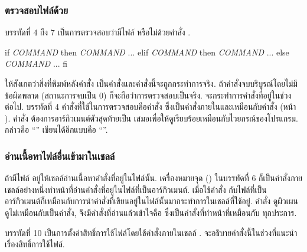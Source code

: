 \begin{thwbr}
\subsubsection{ตรวจสอบไฟล์ด้วย }
บรรทัดที่ 4 ถึง 7 เป็นการตรวจสอบว่ามีไฟล์  หรือไม่ด้วยคำสั่ง .
\begin{MyVerbatim}
if \textit{COMMAND}
then
    \textit{COMMAND}
    ...
elif \textit{COMMAND}
then
    \textit{COMMAND}
    ...
else
    \textit{COMMAND}
    ...
fi
\end{MyVerbatim}
ให้สังเกตว่าสิ่งที่พิมพ์หลังคำสั่ง  เป็นคำสั่งและคำสั่งนี้จะถูกกระทำการจริง. ถ้าคำสั่งจบบริบูรณ์โดยไม่มีข้อผิดพลาด (สถานะการจบเป็น 0) ก็จะถือว่าการตรวจสอบเป็นจริง. จะกระทำการคำสั่งที่อยู่ในช่วง  ต่อไป. บรรทัดที่ 4 คำสั่งที่ใช้ในการตรวจสอบคือคำสั่ง \cmd{[}\cindex{[} ซึ่งเป็นคำสั่งภายในและเหมือนกับคำสั่ง  (หน้า \pageref{cmd:test}). คำสั่ง \cmd{[} ต้องการอาร์กิวเมนต์ตัวสุดท้ายเป็น \cmd{]} เสมอเพื่อให้ดูเรียบร้อยเหมือนกับไวยกรณ์ของโปรแกรม. กล่าวคือ ``'' เขียนได้อีกแบบคือ ``''. 

\subsubsection{อ่านเนื้อหาไฟล์อื่นเข้ามาในเชลล์}
ถ้ามีไฟล์  อยู่ให้เชลล์อ่านเนื้อหาคำสั่งที่อยู่ในไฟล์นั้น. เครื่องหมายจุด () ในบรรทัดที่ 6 ก็เป็นคำสั่งภายเชลล์อย่างหนึ่งทำหน้าที่อ่านคำสั่งที่อยู่ในไฟล์ที่เป็นอาร์กิวเมนต์. เมื่อใช้คำสั่ง  กับไฟล์ที่เป็นอาร์กิวเมนต์ก็เหมือนกับการนำคำสั่งที่เขียนอยู่ในไฟล์นั้นมากระทำการในเชลล์ที่ใช้อยู่. คำสั่ง  ดูผิวเผนดูไม่เหมือนกับเป็นคำสั่ง, จึงมีคำสั่งที่อ่านแล้วเข้าใจคือ  ซึ่งเป็นคำสั่งที่ทำหน้าที่เหมือนกับ  ทุกประการ.

\bigskip
บรรทัดที่ 10 เป็นการตั้งค่าสิทธิ์การใช้ไฟล์โดยใช้คำสั่งภายในเชลล์ . จะอธิบายคำสั่งนี้ในช่วงที่แนะนำเรื่องสิทธิ์การใช้ไฟล์. 


\end{thwbr}
